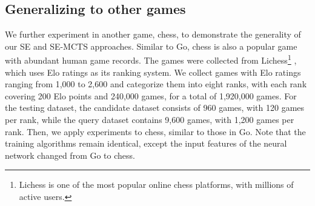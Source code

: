 


%

\subsection{Generalizing to other games}
\label{subsec:generality}

We further experiment in another game, chess, to demonstrate the generality of our SE and SE-MCTS approaches.
Similar to Go, chess is also a popular game with abundant human game records.
The games were collected from Lichess\footnote{Lichess is one of the most popular online chess platforms, with millions of active users.} \citep{lichess_2025}, which uses Elo ratings as its ranking system.
We collect games with Elo ratings ranging from 1,000 to 2,600 and categorize them into eight ranks, with each rank covering 200 Elo points and 240,000 games, for a total of 1,920,000 games.
For the testing dataset, the candidate dataset consists of 960 games, with 120 games per rank, while the query dataset contains 9,600 games, with 1,200 games per rank.
Then, we apply experiments to chess, similar to those in Go.
Note that the training algorithms remain identical, except the input features of the neural network changed from Go to chess.


